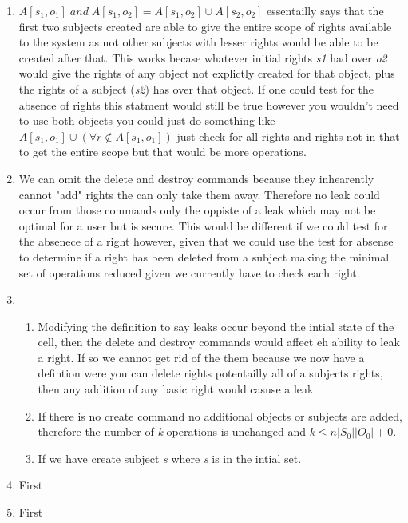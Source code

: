 \documentclass[journal,onecolumn]{IEEEtran}
\begin{document}
\begin{enumerate}
  \item \(A[s_1,o_1] \; and \; A[s_1,o_2] = A[s_1,o_2] \cup A[s_2,o_2]\) essentailly says that the first two subjects created are able to give the entire scope of rights available to the system as not other subjects with lesser rights would be able to be created after that. This works becase whatever initial rights \textit{s1} had over \textit{o2} would give the rights of any object not explictly created for that object, plus the rights of a subject (\textit{s2}) has over that object.
  If one could test for the absence of rights this statment would still be true however you wouldn't need to use both objects you could just do something like \(A[s_1,o_1] \cup (\forall r \not\in A[s_1,o_1])\) just check for all rights and rights not in that to get the entire scope but that would be more operations.
  \item We can omit the delete and destroy commands because they inhearently cannot "add" rights the can only take them away. Therefore no leak could occur from those commands only the oppiste of a leak which may not be optimal for a user but is secure. This would be different if we could test for the absenece of a right however, given that we could use the test for absense to determine if a right has been deleted from a subject making the minimal set of operations reduced given we currently have to check each right. 
  \item 
  \begin{enumerate}
    \item Modifying the definition to say leaks occur beyond the intial state of the cell, then the delete and destroy commands would affect eh ability to leak a right. If so we cannot get rid of the them because we now have a defintion were you can delete rights potentailly all of a subjects rights, then any addition of any basic right would casuse a leak. 
    \item If there is no create command no additional objects or subjects are added, therefore the number of \textit{k} operations is unchanged and \(k \leq n|S_0||O_0| + 0\).
    \item If we have create subject \textit{s} where \textit{s} is in the intial set. 
  \end{enumerate}
  \item First
  \item First
\end{enumerate}

\end{document}
